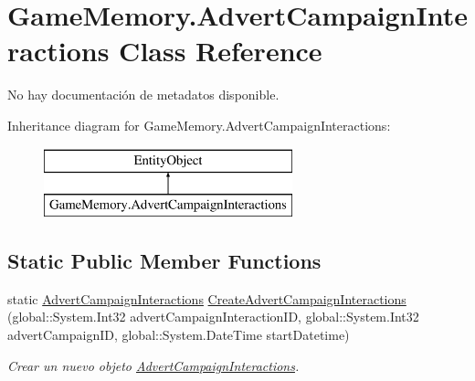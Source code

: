 \hypertarget{class_game_memory_1_1_advert_campaign_interactions}{\section{Game\-Memory.\-Advert\-Campaign\-Interactions Class Reference}
\label{class_game_memory_1_1_advert_campaign_interactions}
}


No hay documentación de metadatos disponible.  


Inheritance diagram for Game\-Memory.\-Advert\-Campaign\-Interactions\-:\begin{figure}[H]
\begin{center}
\leavevmode
\includegraphics[height=2.000000cm]{class_game_memory_1_1_advert_campaign_interactions}
\end{center}
\end{figure}
\subsection*{Static Public Member Functions}
\begin{DoxyCompactItemize}
\item 
static \hyperlink{class_game_memory_1_1_advert_campaign_interactions}{Advert\-Campaign\-Interactions} \hyperlink{class_game_memory_1_1_advert_campaign_interactions_a6a464a87734cfdc93b4cb680fa745f9b}{Create\-Advert\-Campaign\-Interactions} (global\-::\-System.\-Int32 advert\-Campaign\-Interaction\-I\-D, global\-::\-System.\-Int32 advert\-Campaign\-I\-D, global\-::\-System.\-Date\-Time start\-Datetime)
\begin{DoxyCompactList}\small\item\em Crear un nuevo objeto \hyperlink{class_game_memory_1_1_advert_campaign_interactions}{Advert\-Campaign\-Interactions}. \end{DoxyCompactList}\end{DoxyCompactItemize}
